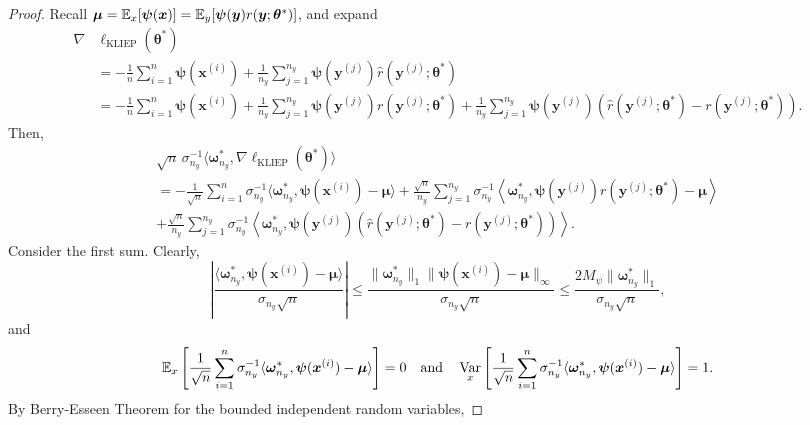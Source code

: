 \documentclass[11pt]{article}
\numberwithin{equation}{section}
\numberwithin{theorem}{section}
\def\fatx{\boldsymbol{x}}
\def\faty{\boldsymbol{y}}
\def\fatmu{\boldsymbol{\mu}}
\def\fattheta{\boldsymbol{\theta}}
\def\fatpsi{\boldsymbol{\psi}}
\def\fatomega{\boldsymbol{\omega}}
\theoremstyle{definition}
\theoremstyle{remark}
\begin{document}
\begin{proof}
Recall $\fatmu = \EE_x[\fatpsi(\fatx)] = \EE_y[\fatpsi(\faty) r(\faty;\fattheta^*)]$, and expand
\begin{equation}
\begin{aligned}
\nabla & \ell_\text{KLIEP}(\fattheta^*) \\
&= -\frac{1}{n} \sum_{i=1}^{n} \fatpsi(\fatx^{(i)}) + \frac{1}{n_y} \sum_{j=1}^{n_y} \fatpsi(\faty^{(j)}) \hat r(\faty^{(j)};\fattheta^*) \\
&= -\frac{1}{n} \sum_{i=1}^{n} \fatpsi(\fatx^{(i)}) + \frac{1}{n_y} \sum_{j=1}^{n_y} \fatpsi(\faty^{(j)}) r(\faty^{(j)};\fattheta^*) + \frac{1}{n_y} \sum_{j=1}^{n_y} \fatpsi(\faty^{(j)}) \left( \hat r(\faty^{(j)};\fattheta^*) - r(\faty^{(j)};\fattheta^*) \right).
\end{aligned}
\end{equation}
Then,
\begin{multline}
\sqrt{n} \, \sigma_{n_y}^{-1} \langle \fatomega_{n_y}^*, \nabla \ell_\text{KLIEP}(\fattheta^*) \rangle \\
= -\frac{1}{\sqrt{n}} \sum_{i=1}^n \sigma_{n_y}^{-1} \langle \fatomega_{n_y}^*, \fatpsi(\fatx^{(i)}) - \fatmu \rangle
+ \frac{\sqrt{n}}{n_y} \sum_{j=1}^{n_y} \sigma_{n_y}^{-1} \left\langle \fatomega_{n_y}^*, \fatpsi(\faty^{(j)}) r(\faty^{(j)};\fattheta^*) - \fatmu \right\rangle \\
+ \frac{\sqrt{n}}{n_y} \sum_{j=1}^{n_y} \sigma_{n_y}^{-1} \left\langle \fatomega_{n_y}^*, \fatpsi(\faty^{(j)}) \left( \hat r(\faty^{(j)};\fattheta^*) - r(\faty^{(j)};\fattheta^*) \right) \right\rangle.
\end{multline}
Consider the first sum.
Clearly,
\begin{equation}
\left| \frac{\langle \fatomega_{n_y}^*, \fatpsi(\fatx^{(i)}) - \fatmu \rangle}{\sigma_{n_y} \sqrt{n}} \right|
\leq \frac{\|\fatomega_{n_y}^*\|_1 \|\fatpsi(\fatx^{(i)}) - \fatmu\|_\infty}{\sigma_{n_y} \sqrt{n}}
\leq \frac{2 M_\psi \|\fatomega_{n_y}^*\|_1}{\sigma_{n_y} \sqrt{n}},
\end{equation}
and
\begin{equation}
\EE_x \left[ \frac{1}{\sqrt{n}} \sum_{i=1}^n \sigma_{n_y}^{-1} \langle \fatomega_{n_y}^*, \fatpsi(\fatx^{(i)}) - \fatmu \rangle \right] = 0
\quad\text{and}\quad
\Var_x \left[ \frac{1}{\sqrt{n}} \sum_{i=1}^n \sigma_{n_y}^{-1} \langle \fatomega_{n_y}^*, \fatpsi(\fatx^{(i)}) - \fatmu \rangle \right] = 1.
\end{equation}
By Berry-Esseen Theorem for the bounded independent random variables,

\end{proof}
\end{document}
